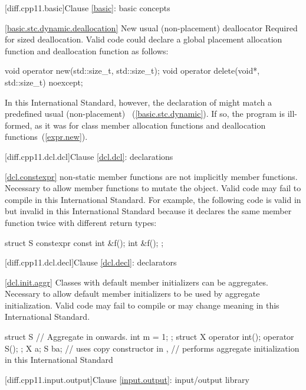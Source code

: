 [diff.cpp11.basic]{Clause \ref{basic}: basic concepts}

\ref{basic.stc.dynamic.deallocation}
\change New usual (non-placement) deallocator 
\rationale Required for sized deallocation.
\effect Valid \CppXI code could declare a global placement allocation function and
deallocation function as follows:

\begin{codeblock}
void operator new(std::size_t, std::size_t);
void operator delete(void*, std::size_t) noexcept;
\end{codeblock}

In this International Standard, however, the declaration of 
might match a predefined usual (non-placement)
~(\ref{basic.stc.dynamic}). If so, the
program is ill-formed, as it was for class member allocation functions and
deallocation functions~(\ref{expr.new}).

[diff.cpp11.dcl.dcl]{Clause \ref{dcl.dcl}: declarations}

\ref{dcl.constexpr}
\change {} non-static member functions are not implicitly
 member functions.
\rationale Necessary to allow  member functions to mutate
the object.
\effect
Valid \CppXI code may fail to compile in this International Standard.
For example, the following code is valid in \CppXI
but invalid in this International Standard because it declares the same member
function twice with different return types:

\begin{codeblock}
struct S {
  constexpr const int &f();
  int &f();
};
\end{codeblock}

[diff.cpp11.dcl.decl]{Clause \ref{dcl.decl}: declarators}

\ref{dcl.init.aggr}
\change Classes with default member initializers can be aggregates.
\rationale Necessary to allow default member initializers to be used
by aggregate initialization.
\effect
Valid \CppXI code may fail to compile or may change meaning in this International Standard.
\begin{codeblock}
struct S { // Aggregate in \CppXIV onwards.
  int m = 1;
};
struct X {
  operator int();
  operator S();
};
X a{};
S b{a};  // uses copy constructor in \CppXI,
         // performs aggregate initialization in this International Standard
\end{codeblock}

[diff.cpp11.input.output]{Clause \ref{input.output}: input/output library}

